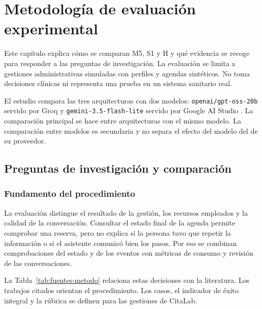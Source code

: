 \chapter{Metodología de evaluación experimental}
\label{chap:metodologia-evaluacion}

Este capítulo explica cómo se comparan M5, S1 y H y qué evidencia se recoge para
responder a las preguntas de investigación. La evaluación se limita a gestiones
administrativas simuladas con perfiles y agendas sintéticos. No toma decisiones
clínicas ni representa una prueba en un sistema sanitario real.

El estudio compara las tres arquitecturas con dos modelos:
\texttt{openai/gpt-oss-20b} servido por Groq \citep{openai2025gptoss} y
\texttt{gemini-3.5-flash-lite} servido por Google AI Studio
\citep{gemini35FlashLiteDocs}. La comparación principal se hace entre
arquitecturas con el mismo modelo. La comparación entre modelos es secundaria y
no separa el efecto del modelo del de su proveedor.

\section{Preguntas de investigación y comparación}
\label{sec:metodo-preguntas}

\subsection{Fundamento del procedimiento}

La evaluación distingue el resultado de la gestión, los recursos empleados y
la calidad de la conversación. Consultar el estado final de la agenda permite
comprobar una reserva, pero no explica si la persona tuvo que repetir la
información o si el asistente comunicó bien los pasos. Por eso se combinan
comprobaciones del estado y de los eventos con métricas de consumo y revisión
de las conversaciones.

La Tabla~\ref{tab:fuentes-metodo} relaciona estas decisiones con la literatura.
Los trabajos citados orientan el procedimiento. Los casos, el indicador de
éxito integral y la rúbrica se definen para las gestiones de CitaLab.

